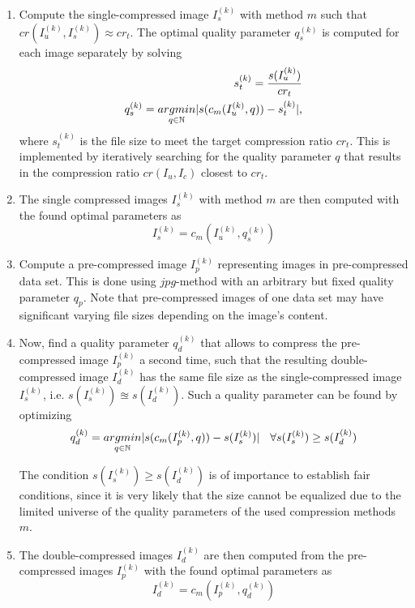 \documentclass[10pt,twocolumn,letterpaper]{article}
\begin{document}
\begin{enumerate}
	\item Compute the single-compressed image $I_s^{(k)}$ with method $m$ such that $cr(I_u^{(k)}, I_s^{(k)}) \approx cr_t$. The optimal quality parameter $q_s^{(k)}$ is computed for each image separately by solving
	\begin{eqnarray}
	\small
	s_t^{(k)} = \frac{s(I_u^{(k)})}{cr_t} \\
		q_s^{(k)} = \underset{q \in \mathbb{N}}{argmin}|s(c_m(I_u^{(k)},q)) - s_t^{(k)}|,
	\end{eqnarray} where $s_t^{(k)}$ is the file size to meet the target compression ratio $cr_t$. This is implemented by iteratively searching for the quality parameter $q$ that results in the compression ratio $cr(I_u, I_c)$ closest to $cr_t$. 
	\item The single compressed images $I_s^{(k)}$ with method $m$ are then computed with the found optimal parameters as
	\begin{equation}
	I_s^{(k)} = c_m(I_u^{(k)}, q_s^{(k)})
	\end{equation}
	
	\item Compute a pre-compressed image $I_p^{(k)}$ representing images in pre-compressed data set. This is done using $jpg$-method \cite{jpg} with an arbitrary but fixed quality parameter $q_p$. Note that pre-compressed images of one data set may have significant varying file sizes depending on the image's content.
	
	\item Now, find a quality parameter $q_d^{(k)}$ that allows to compress the pre-compressed image $I_p^{(k)}$ a second time, such that the resulting double-compressed image $I_d^{(k)}$ has the same file size as the single-compressed image $I_s^{(k)}$, i.e. $s(I_s^{(k)}) \approxeq s(I_d^{(k)})$. Such a quality parameter can be found by optimizing
	\begin{equation}
	\small
		q_d^{(k)} = \underset{q \in \mathbb{N}}{argmin}|s(c_m(I_p^{(k)},q)) - s(I_s^{(k)})| \quad \forall s(I_s^{(k)}) \geq s(I_d^{(k)})
	\end{equation}
	
	The condition $s(I_s^{(k)}) \geq s(I_d^{(k)})$ is of importance to establish fair conditions, since it is very likely that the size cannot be equalized due to the limited universe of the quality parameters of the used compression methods $m$.
	
	\item The double-compressed images $I_d^{(k)}$ are then computed from the pre-compressed images $I_p^{(k)}$ with the found optimal parameters as
	\begin{equation}
		I_d^{(k)} = c_m(I_p^{(k)}, q_d^{(k)})
	\end{equation}
	
\end{enumerate}
\end{document}
